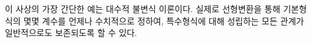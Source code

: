 
이 사상의 가장 간단한 예는 대수적 불변식 이론이다. 실제로 선형변환을 통해 기본형식의 몇몇 계수를 언제나 수치적으로 정하여, 특수형식에 대해 성립하는 모든 관계가 일반적으로도 보존되도록 할 수 있다.
